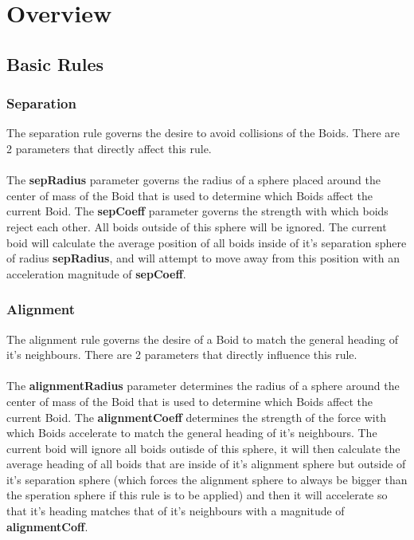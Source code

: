 \documentclass[12pt]{article}
\begin{document}
\section{Overview}
\subsection{Basic Rules}
\subsubsection{Separation}
The separation rule governs the desire to avoid collisions of the Boids. There are 2 parameters that directly affect this rule.
\\ \\
The \textbf{sepRadius} parameter governs the radius of a sphere placed around the center of mass of the Boid that is used to determine which Boids affect the current Boid. The \textbf{sepCoeff} parameter governs the strength with which boids reject each other. All boids outside of this sphere will be ignored. The current boid will calculate the average position of all boids inside of it's separation sphere of radius \textbf{sepRadius}, and will attempt to move away from this position with an acceleration magnitude of \textbf{sepCoeff}.

\subsubsection{Alignment}
The alignment rule governs the desire of a Boid to match the general heading of it's neighbours. There are 2 parameters that directly influence this rule.
\\ \\
The \textbf{alignmentRadius} parameter determines the radius of a sphere around the center of mass of the Boid that is used to determine which Boids affect the current Boid. The \textbf{alignmentCoeff} determines the strength of the force with which Boids accelerate to match the general heading of it's neighbours. The current boid will ignore all boids outisde of this sphere, it will then calculate the average heading of all boids that are inside of it's alignment sphere but outside of it's separation sphere (which forces the alignment sphere to always be bigger than the speration sphere if this rule is to be applied) and then it will accelerate so that it's heading matches that of it's neighbours with a magnitude of \textbf{alignmentCoff}.
\end{document}

